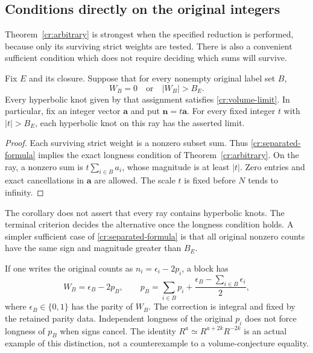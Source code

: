 \subsection{Conditions directly on the original integers}

Theorem~\ref{cr:arbitrary} is strongest when the specified reduction is performed, because only its surviving strict weights are tested. There is also a convenient sufficient condition which does not require deciding which sums will survive.

\begin{corollary}\label{cr:separated}
Fix $E$ and its closure. Suppose that for every nonempty original label set $B$,
\begin{equation}\label{cr:separated-formula}
                       W_B=0\quad\text{or}\quad|W_B|>B_E.
\end{equation}
Every hyperbolic knot given by that assignment satisfies \eqref{cr:volume-limit}. In particular, fix an integer vector $\mathbf a$ and put $\mathbf n=t\mathbf a$. For every fixed integer $t$ with $|t|>B_E$, each hyperbolic knot on this ray has the asserted limit.
\end{corollary}
\begin{proof}
Each surviving strict weight is a nonzero subset sum. Thus \eqref{cr:separated-formula} implies the exact longness condition of Theorem~\ref{cr:arbitrary}. On the ray, a nonzero sum is $t\sum_{i\in B}a_i$, whose magnitude is at least $|t|$. Zero entries and exact cancellations in $\mathbf a$ are allowed. The scale $t$ is fixed before $N$ tends to infinity.
\end{proof}

The corollary does not assert that every ray contains hyperbolic knots. The terminal criterion decides the alternative once the longness condition holds. A simpler sufficient case of \eqref{cr:separated-formula} is that all original nonzero counts have the same sign and magnitude greater than $B_E$.

If one writes the original counts as $n_i=\epsilon_i-2p_i$, a block has
\begin{equation}\label{cr:net-slope}
 W_B=\epsilon_B-2p_B,\qquad
 p_B=\sum_{i\in B}p_i+
             \frac{\epsilon_B-\sum_{i\in B}\epsilon_i}{2},
\end{equation}
where $\epsilon_B\in\{0,1\}$ has the parity of $W_B$. The correction is integral and fixed by the retained parity data. Independent longness of the original $p_i$ does not force longness of $p_B$ when signs cancel. The identity $R^a\simeq R^{a+2k}R^{-2k}$ is an actual example of this distinction, not a counterexample to a volume-conjecture equality.

